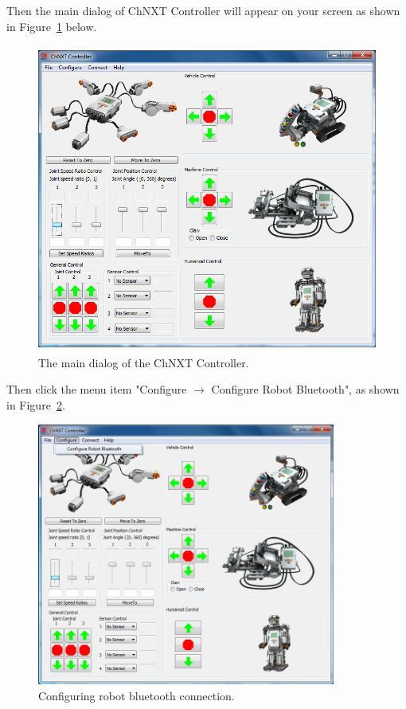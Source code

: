 \documentclass[11pt]{article}
\begin{document}
Then the main dialog of ChNXT Controller will appear on your screen as shown in Figure~\ref{fig:main_dialog} below.

\begin{figure}[H]
  \begin{center}
    \includegraphics[height=4in]{figure/configuration/mainDlg.png}
    \caption{The main dialog of the ChNXT Controller.\label{fig:main_dialog}}
  \end{center}
\end{figure}

Then click the menu item "Configure $\rightarrow$ Configure Robot Bluetooth", as shown in Figure~\ref{fig:menu_config}.

\begin{figure}[H]
  \begin{center}
    \includegraphics[height=3.4in]{figure/configuration/menuConfig.png}
    \caption{Configuring robot bluetooth connection.\label{fig:menu_config}}
  \end{center}
\end{figure}
\end{document}

